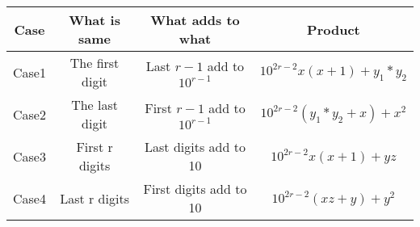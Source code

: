\begin{table}[h]
\begin{center}
\begin{tabular}{|c|c|c|c|}
    \hline
    Case & What is same & What adds to what & Product\\
    \hline
    Case1 & The first digit & Last $r-1$ add to $10^{r-1}$ & $10^{2r-2}x(x+1)+y_1*y_2$\\
    \hline
    Case2 & The last digit & First $r-1$ add to $10^{r-1}$ & $10^{2r-2}(y_1*y_2+x)+x^2$\\
    \hline
    Case3 & First r digits & Last digits add to 10 & $10^{2r-2}x(x + 1)+yz$\\
    \hline
    Case4 & Last r digits & First digits add to 10 & $10^{2r-2}(xz+y)+y^2$\\
    \hline
\end{tabular}
\end{center}
\end{table}

